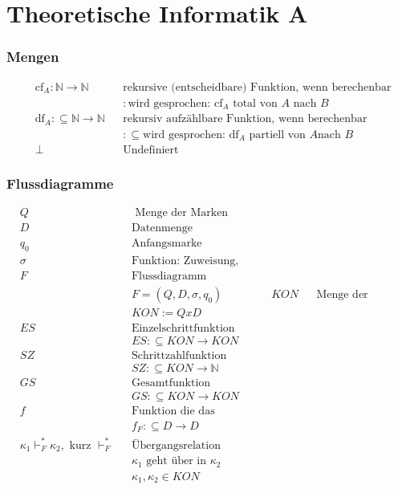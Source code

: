 \documentclass[10pt,oneside,a4paper]{scrartcl}
\begin{document}
\part{Theoretische Informatik A}

\section{Mengen}

    \begin{align}
    &\text{cf}_A :\mathbb{N} \longrightarrow \mathbb{N}
        && \text{rekursive (entscheidbare) Funktion, wenn berechenbar}\\
        &&&: \text{wird gesprochen: $\text{cf}_A$ total von $A$ nach $B$}
        \nonumber\\
    &\text{df}_A :\subseteq \mathbb{N} \longrightarrow \mathbb{N}
        && \text{rekursiv aufzählbare Funktion, wenn berechenbar}\\
        &&&:\subseteq \text{wird gesprochen: $\text{df}_A$ partiell von $A$
        nach $B$}\nonumber\\
    &\perp && \text{Undefiniert}
    \end{align}

\section{Flussdiagramme}

    \begin{align}
     & Q        && \text{ Menge der Marken} \\
     & D        && \text{Datenmenge}\\
     & q_0     &&  \text{Anfangsmarke} \\
     & \sigma && \text{Funktion: Zuweisung, Verzweigung oder HALT}\\
    &F   && \text{Flussdiagramm}\nonumber\\
            &&&F = (Q, D, \sigma, q_0)
    &KON && \text{Menge der Konfigurationen}\nonumber\\
            &&&KON := Q x D\\
    &ES  && \text{Einzelschrittfunktion}\nonumber\\
            &&&ES :\subseteq KON \longrightarrow KON\\
    &SZ  && \text{Schrittzahlfunktion}\nonumber\\
            &&&SZ :\subseteq KON \longrightarrow \mathbb{N}\\
    &GS  && \text{Gesamtfunktion}\nonumber\\
            &&&GS :\subseteq KON \longrightarrow KON\\
    &f   && \text{Funktion die das Flussdiagramm berechnet}\nonumber\\
            &&&f_F :\subseteq D \longrightarrow D\\
    & \kappa_{1} \vdash^{*}_{F} \kappa_{2}, \text{ kurz }  \vdash^{*}_{F}
         && \text{Übergangsrelation}\\
            &&&\kappa_{1} \text{ geht über in }\kappa_{2}\nonumber\\
            &&&\kappa_{1}, \kappa_{2} \in KON\nonumber
    \end{align}
\end{document}
